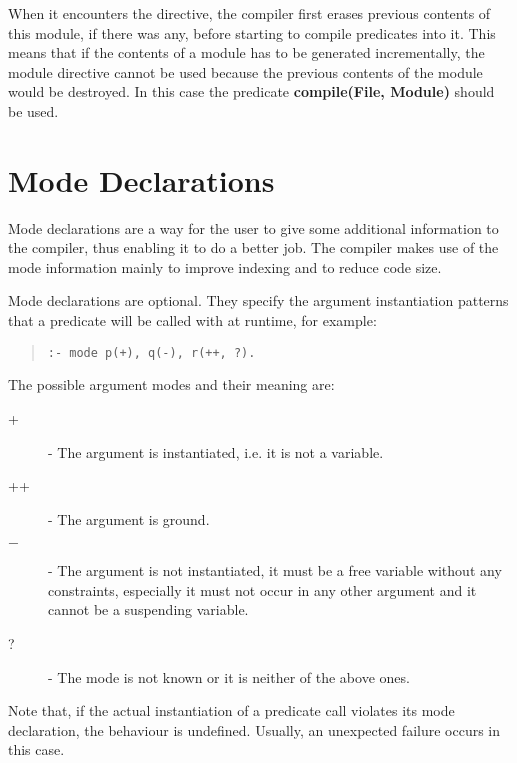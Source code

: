 When it encounters the  directive,
the compiler first erases previous contents of this module,
if there was any, before starting to compile predicates
into it.
This means that if the contents of a module has to be
generated incrementally, the module directive cannot be used
because the previous contents of the module would be destroyed.
In this case the predicate {\bf compile(File, Module)}
should be used.

\section{Mode Declarations}
Mode declarations are a way for the user to give some additional
information to the compiler, thus enabling it to do a better job.
The {\eclipse} compiler makes use of the mode information mainly to
improve indexing and to reduce code size.

Mode declarations are optional. They specify the argument instantiation
patterns that a predicate will be called with at runtime, for example:
\begin{quote}
\begin{verbatim}
:- mode p(+), q(-), r(++, ?).
\end{verbatim}
\end{quote}
The possible argument modes and their meaning are:
\begin{description}
\item[+] - The argument is instantiated, i.e. it is not a variable.

\item[++] - The argument is ground.

\item[$-$] - The argument is not instantiated, it must be a free variable
without any constraints, especially it must not occur in any other
argument and it cannot be a suspending variable.

\item[?] - The mode is not known or it is neither of the above ones.
\end{description}

Note that, if the actual instantiation of a predicate call violates
its mode declaration, the behaviour is undefined.
Usually, an unexpected failure occurs in this case.

